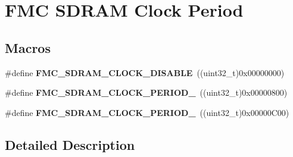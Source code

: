 \hypertarget{group___f_m_c___s_d_r_a_m___clock___period}{}\section{F\+MC S\+D\+R\+AM Clock Period}
\label{group___f_m_c___s_d_r_a_m___clock___period}
\subsection*{Macros}
\begin{DoxyCompactItemize}
\item 
\#define {\bfseries F\+M\+C\+\_\+\+S\+D\+R\+A\+M\+\_\+\+C\+L\+O\+C\+K\+\_\+\+D\+I\+S\+A\+B\+LE}~((uint32\+\_\+t)0x00000000)\hypertarget{group___f_m_c___s_d_r_a_m___clock___period_ga7f461258f347622159b9e7ccb9d5b727}{}\label{group___f_m_c___s_d_r_a_m___clock___period_ga7f461258f347622159b9e7ccb9d5b727}

\item 
\#define {\bfseries F\+M\+C\+\_\+\+S\+D\+R\+A\+M\+\_\+\+C\+L\+O\+C\+K\+\_\+\+P\+E\+R\+I\+O\+D\+\_}~((uint32\+\_\+t)0x00000800)\hypertarget{group___f_m_c___s_d_r_a_m___clock___period_gad245ddc6c69736fd6dcfc5a9ca922e73}{}\label{group___f_m_c___s_d_r_a_m___clock___period_gad245ddc6c69736fd6dcfc5a9ca922e73}

\item 
\#define {\bfseries F\+M\+C\+\_\+\+S\+D\+R\+A\+M\+\_\+\+C\+L\+O\+C\+K\+\_\+\+P\+E\+R\+I\+O\+D\+\_}~((uint32\+\_\+t)0x00000\+C00)\hypertarget{group___f_m_c___s_d_r_a_m___clock___period_ga0ba047762065d7a39f1f979c48c19c2b}{}\label{group___f_m_c___s_d_r_a_m___clock___period_ga0ba047762065d7a39f1f979c48c19c2b}

\end{DoxyCompactItemize}


\subsection{Detailed Description}
